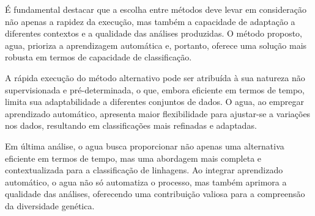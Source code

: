 É fundamental destacar que a escolha entre métodos deve levar em consideração não apenas a rapidez da execução, mas também a capacidade de adaptação a diferentes contextos e a qualidade das análises produzidas. O método proposto, \gls{agua}, prioriza a aprendizagem automática e, portanto, oferece uma solução mais robusta em termos de capacidade de classificação.

A rápida execução do método alternativo pode ser atribuída à sua natureza não supervisionada e pré-determinada, o que, embora eficiente em termos de tempo, limita sua adaptabilidade a diferentes conjuntos de dados. O \gls{agua}, ao empregar aprendizado automático, apresenta maior flexibilidade para ajustar-se a variações nos dados, resultando em classificações mais refinadas e adaptadas.

Em última análise, o \gls{agua} busca proporcionar não apenas uma alternativa eficiente em termos de tempo, mas uma abordagem mais completa e contextualizada para a classificação de linhagens. Ao integrar aprendizado automático, o \gls{agua} não só automatiza o processo, mas também aprimora a qualidade das análises, oferecendo uma contribuição valiosa para a compreensão da diversidade genética.


